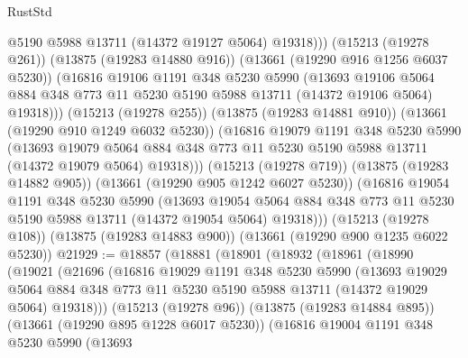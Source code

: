 \begin{lexlean}{RustStd}
\begin{coremodule}
                @5190
                @5988
                @13711
                (@14372 @19127 @5064)
                @19318)))
          (@15213 (@19278 @261))
          (@13875 (@19283 @14880 @916))
          (@13661 (@19290 @916 @1256 @6037 @5230))
          (@16816
            @19106
            @1191
            @348
            @5230
            @5990
            (@13693
              @19106
              @5064
              @884
              @348
              @773
              @11
              @5230
              @5190
              @5988
              @13711
              (@14372 @19106 @5064)
              @19318)))
        (@15213 (@19278 @255))
        (@13875 (@19283 @14881 @910))
        (@13661 (@19290 @910 @1249 @6032 @5230))
        (@16816
          @19079
          @1191
          @348
          @5230
          @5990
          (@13693
            @19079
            @5064
            @884
            @348
            @773
            @11
            @5230
            @5190
            @5988
            @13711
            (@14372 @19079 @5064)
            @19318)))
      (@15213 (@19278 @719))
      (@13875 (@19283 @14882 @905))
      (@13661 (@19290 @905 @1242 @6027 @5230))
      (@16816
        @19054
        @1191
        @348
        @5230
        @5990
        (@13693
          @19054
          @5064
          @884
          @348
          @773
          @11
          @5230
          @5190
          @5988
          @13711
          (@14372 @19054 @5064)
          @19318)))
    (@15213 (@19278 @108))
    (@13875 (@19283 @14883 @900))
    (@13661 (@19290 @900 @1235 @6022 @5230))
@21929 := @18857
    (@18881
      (@18901
        (@18932
          (@18961
            (@18990
              (@19021
                (@21696
                  (@16816
                    @19029
                    @1191
                    @348
                    @5230
                    @5990
                    (@13693
                      @19029
                      @5064
                      @884
                      @348
                      @773
                      @11
                      @5230
                      @5190
                      @5988
                      @13711
                      (@14372 @19029 @5064)
                      @19318)))
                (@15213 (@19278 @96))
                (@13875 (@19283 @14884 @895))
                (@13661 (@19290 @895 @1228 @6017 @5230))
                (@16816
                  @19004
                  @1191
                  @348
                  @5230
                  @5990
                  (@13693

\end{coremodule}
\end{lexlean}
